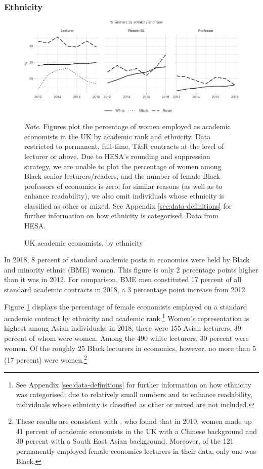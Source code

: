 \documentclass[a4paper, 1]{article}
\begin{document}
\hypertarget{ethnicity}{%
\subsubsection{Ethnicity}\label{ethnicity}}



\begin{figure}
\centering
\includegraphics[width=\linewidth]{0-images/ethnicity-1.pdf}

\caption{UK academic economists, by ethnicity}
\label{fig:ethnicity}
\justify\footnotesize\textit{Note}.  Figures plot the percentage of women employed as academic economists in the UK by academic rank and ethnicity. Data restricted to permanent, full-time, T\&R contracts at the level of lecturer or above. Due to HESA's rounding and suppression strategy, we are unable to plot the percentage of women among Black senior lecturers/readers, and the number of female Black professors of economics is zero; for similar reasons (as well as to enhance readability), we also omit individuals whose ethnicity is classified as other or mixed. See Appendix \ref{sec:data-definitions} for further information on how ethnicity is categorised. Data from HESA.
\end{figure}



In 2018, 8 percent of standard academic posts in economics were held by Black and minority ethnic (BME) women. This figure is only 2 percentage points higher than it was in 2012. For comparison, BME men constituted 17 percent of all standard academic contracts in 2018, a 3 percentage point increase from 2012.

Figure \ref{fig:ethnicity} displays the percentage of female economists employed on a standard academic contract by ethnicity and academic rank.\footnote{See Appendix \ref{sec:data-definitions} for further information on how ethnicity was categorised; due to relatively small numbers and to enhance readability, individuals whose ethnicity is classified as other or mixed are not included.} Women's representation is highest among Asian individuals: in 2018, there were 155 Asian lecturers, 39 percent of whom were women. Among the 490 white lecturers, 30 percent were women. Of the roughly 25 Black lecturers in economics, however, no more than 5 (17 percent) were women.\footnote{These results are consistent with \citet{Blanco2010}, who found that in 2010, women made up 41 percent of academic economists in the UK with a Chinese background and 30 percent with a South East Asian background. Moreover, of the 121 permanently employed female economics lecturers in their data, only one was Black.}
\end{document}
